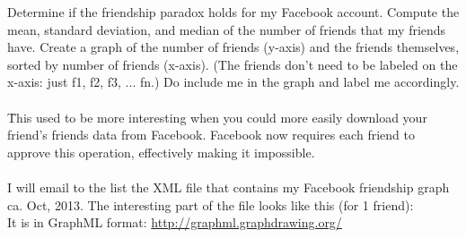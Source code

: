 Determine if the friendship paradox holds for my Facebook
account.\* Compute the mean, standard deviation, and median of the
number of friends that my friends have.  Create a graph of the
number of friends (y-axis) and the friends themselves, sorted by
number of friends (x-axis).  (The friends don't need to be labeled
on the x-axis: just f1, f2, f3, ... fn.)  Do include me in the graph
and label me accordingly.\\
\\
\* \= This used to be more interesting when you could more easily download
your friend's friends data from Facebook.  Facebook now requires each
friend to approve this operation, effectively making it impossible.\\
\\
I will email to the list the XML file that contains my Facebook
friendship graph ca. Oct, 2013.  The interesting part of the file looks
like this (for 1 friend):
\\


It is in GraphML format: \url{http://graphml.graphdrawing.org/}